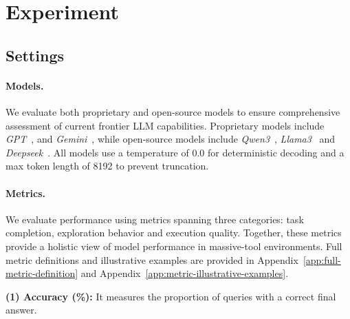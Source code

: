 \section{Experiment}










\subsection{Settings}

\paragraph{Models.}

We evaluate both proprietary and open-source models to ensure comprehensive assessment of current frontier LLM capabilities.
Proprietary models include 
\textit{GPT}~\citep{GPT-5.4}, and \textit{Gemini}~\citep{Gemini-3.1-Pro}, while open-source models include \textit{Qwen3}~\citep{Qwen3}, \textit{Llama3}~\citep{Llama-3} and \textit{Deepseek}~\citep{DeepSeek-V4}. 
All models use a temperature of 0.0 for deterministic decoding and a max token length of 8192 to prevent truncation.

\paragraph{Metrics.}
 
We evaluate performance using metrics spanning three categories: task completion, exploration behavior and execution quality.
Together, these metrics provide a holistic view of model performance in massive-tool environments.
Full metric definitions and illustrative examples are provided in Appendix~\ref{app:full-metric-definition} and Appendix~\ref{app:metric-illustrative-examples}.

\noindent \textbf{(1) Accuracy (\%):} It measures the proportion of queries with a correct final answer.


